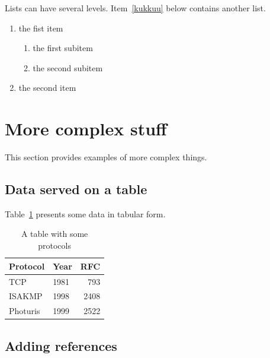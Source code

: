 \documentclass[a4paper,12pt]{article}
\begin{document}
Lists can have several levels. Item~\ref{kukkuu} below contains
another list.
\begin{enumerate}
\item the fist item \label{kukkuu}
  \begin{enumerate}
  \item the first subitem 
  \item the second subitem
  \end{enumerate}
\item the second item
\end{enumerate}




\pagebreak[3]
\section{More complex stuff}

This section provides examples of more complex things.




\subsection{Data served on a table}


Table~\ref{tab:mytable1} presents some data in tabular form. 

\begin{table}[t]
  \begin{center}
    \begin{tabular}{|l|lr|}
    \hline
    Protocol & Year &  RFC \\
    \hline
    TCP      & 1981 &  793 \\
    ISAKMP   & 1998 & 2408 \\
    Photuris & 1999 & 2522 \\
    \hline
    \end{tabular}
    \caption{A table with some protocols}
    \label{tab:mytable1}
  \end{center}
\end{table}




\subsection{Adding references}\label{sec:references}
\end{document}
